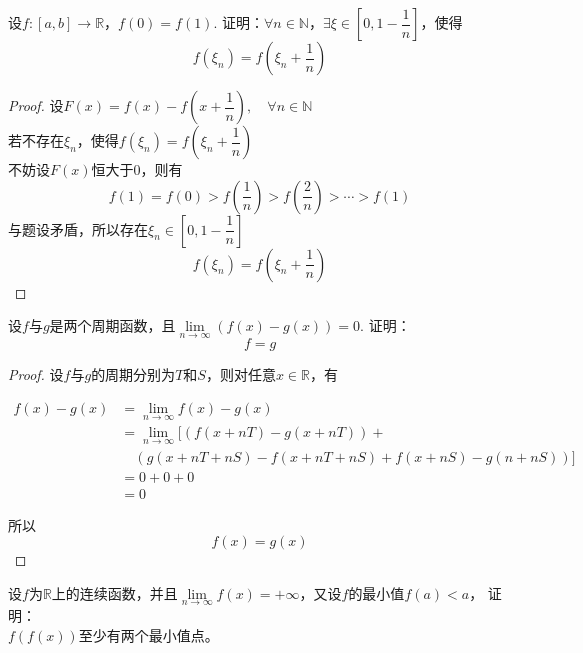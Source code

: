 \begin{proposition}

    设$f:[a,b]\to \mathbb{R}$，$f(0)=f(1)$.
    证明：$\forall n\in \mathbb{N}$，$\exists \xi \in \left[0,1-\dfrac{1}{n}\right]$，使得
    $$f(\xi_n) = f\left(\xi_n+\dfrac{1}{n}\right)$$

\end{proposition}

\begin{proof}
    
    设$F(x) = f(x) - f\left(x + \dfrac{1}{n}\right),\quad \forall n \in \mathbb{N}$\\
    若不存在$\xi_n$，使得$f(\xi_n) = f\left(\xi_n+\dfrac{1}{n}\right)$\\
    不妨设$F(x)$恒大于$0$，则有
    $$f(1) = f(0) > f\left(\dfrac{1}{n}\right) > f\left(\dfrac{2}{n}\right) > \cdots > f(1)$$
    与题设矛盾，所以存在$\xi_n \in \left[0,1-\dfrac{1}{n}\right]$
    $$f(\xi_n) = f\left(\xi_n + \dfrac{1}{n}\right)$$

\end{proof}

\begin{proposition}
    
    设$f$与$g$是两个周期函数，且$\lim\limits_{n\to\infty}{(f(x)-g(x))}=0$.
    证明：
    $$f = g $$

\end{proposition}

\begin{proof}
    
    设$f$与$g$的周期分别为$T$和$S$，则对任意$x \in \mathbb{R}$，有
    
    \begin{align*}
        f(x)-g(x) &= \lim\limits_{n\to\infty}{f(x)-g(x)}\\
        &= \lim\limits_{n\to\infty}[(f(x+nT)-g(x+nT))+\\
        &\quad(g(x+nT+nS)-f(x+nT+nS)+f(x+nS)-g(n+nS))]\\
        &= 0 + 0 + 0\\
        &= 0
    \end{align*}

    所以
    $$f(x)=g(x)$$

\end{proof}

\begin{proposition}
    
    设$f$为$\mathbb{R}$上的连续函数，并且$\lim\limits_{n\to\infty}{f(x)}=+\infty$，又设$f$的最小值$f(a)<a$，
    证明：\\
    $f(f(x))$至少有两个最小值点。
\end{proposition}

